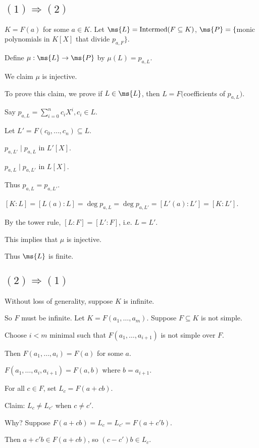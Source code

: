 \documentclass[x11names,reqno,14pt]{extarticle}
\DeclareMathOperator{\Intermed}{Intermed}
\begin{document}
\proof

\subsection*{$(1)\Rightarrow(2)$}

$K = F(a)$ for some $a \in K$. Let $\ms{L} = \Intermed(F\subseteq K)$, $\ms{P} = \{$monic polynomials in $K[X]$ that divide $p_{a, F}\}$. 

Define $\mu:\ms{L}\to\ms{P}$ by $\mu(L) = p_{a, L}$. 

We claim $\mu$ is injective. 

To prove this claim, we prove if $L \in \ms{L}$, then $L = F($coefficients of $p_{a, L})$. 

Say $p_{a, L} = \sum_{i=0}^nc_iX^i, c_i \in L$. 

Let $L' = F(c_0, \dots, c_n) \subseteq L$. 

$p_{a, L'} \mid p_{a, L}$ in $L'[X]$.
 
$p_{a, L} \mid p_{a, L'}$  in $L[X]$. 

Thus $p_{a, L} = p_{a, L'}$. 

$[K:L] = [L(a):L] = \deg p_{a, L} = \deg p_{a, L'} = [L'(a):L'] = [K:L']$. 

By the tower rule, $[L:F] = [L':F]$, i.e. $L = L'$. 

This implies that $\mu$ is injective. 

Thus $\ms{L}$ is finite. 

\subsection*{$(2)\Rightarrow(1)$}

Without loss of generality, suppose $K$ is infinite. 

So $F$ must be infinite. Let $K = F(a_1, \dots, a_m)$. Suppose $F \subseteq K$ is not simple. 

Choose $i < m$ minimal such that $F(a_1, \dots, a_{i + 1})$ is not simple over $F$. 

Then $F(a_1, \dots, a_i) = F(a)$ for some $a$. 

$F(a_1, \dots, a_i, a_{i + 1}) = F(a, b)$ where $b = a_{i + 1}$.

For all $c \in F$, set $L_c = F(a + cb)$. 

Claim: $L_c \neq L_{c'}$ when $c\neq c'$. 

Why? Suppose $F(a + cb) = L_c = L_{c'} = F(a + c'b)$. 

Then $a + c'b \in F(a + cb)$, so $(c - c')b\in L_c$. 
\end{document}
